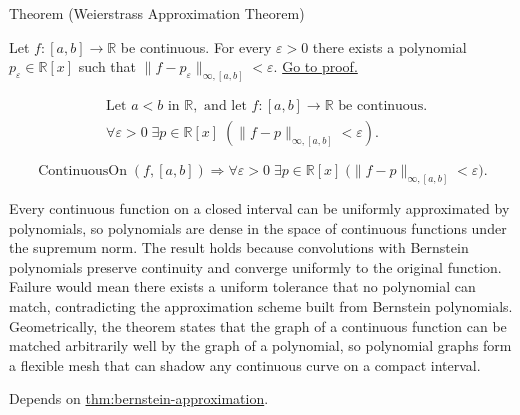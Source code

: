 \NoLocalDependencies

\begin{theorembox}{Theorem (Weierstrass Approximation Theorem)}
\begin{theorem}
\label{thm:weierstrass-approximation}
Let $f:[a,b]\to\mathbb{R}$ be continuous. For every $\varepsilon>0$ there exists a polynomial $p_\varepsilon\in\mathbb{R}[x]$ such that $\|f-p_\varepsilon\|_{\infty,[a,b]}<\varepsilon$.
\hyperref[prf:weierstrass-approximation]{Go to proof.}
\end{theorem}
\end{theorembox}

\begin{remark*}
\[
\begin{aligned}
&\text{Let } a<b \text{ in } \mathbb{R}, \text{ and let } f:[a,b]\to\mathbb{R} \text{ be continuous}.\\
&\forall \varepsilon>0\;\exists p\in\mathbb{R}[x]\;(\|f-p\|_{\infty,[a,b]}<\varepsilon).
\end{aligned}
\]
\end{remark*}

\begin{remark*}
\[
\operatorname{ContinuousOn}(f,[a,b])
\Longrightarrow
\forall \varepsilon>0\;\exists p\in\mathbb{R}[x]\;
\bigl(\|f-p\|_{\infty,[a,b]}<\varepsilon\bigr).
\]
\end{remark*}

\begin{remark*}[Interpretation]
Every continuous function on a closed interval can be uniformly approximated by polynomials, so polynomials are dense in the space of continuous functions under the supremum norm. The result holds because convolutions with Bernstein polynomials preserve continuity and converge uniformly to the original function. Failure would mean there exists a uniform tolerance that no polynomial can match, contradicting the approximation scheme built from Bernstein polynomials. Geometrically, the theorem states that the graph of a continuous function can be matched arbitrarily well by the graph of a polynomial, so polynomial graphs form a flexible mesh that can shadow any continuous curve on a compact interval.
\end{remark*}

\begin{remark*}[Dependencies]
Depends on \hyperref[thm:bernstein-approximation]{thm:bernstein-approximation}.
\end{remark*}

